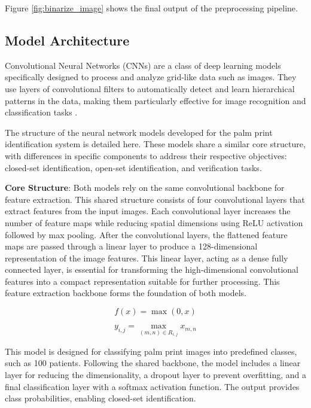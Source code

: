 \begin{enumerate}
    Figure \ref{fig:binarize_image} shows the final output of the preprocessing pipeline.
\end{enumerate}

\subsection{Model Architecture}
Convolutional Neural Networks (CNNs) are a class of deep learning models specifically designed to process and analyze grid-like data such as images. They use layers of convolutional filters to automatically detect and learn hierarchical patterns in the data, making them particularly effective for image recognition and classification tasks \cite{726791}.

The structure of the neural network models developed for the palm print identification system is detailed here. These models share a similar core structure, with differences in specific components to address their respective objectives: closed-set identification, open-set identification, and verification tasks.

\textbf{Core Structure}: Both models rely on the same convolutional backbone for feature extraction. This shared structure consists of four convolutional layers that extract features from the input images. Each convolutional layer increases the number of feature maps while reducing spatial dimensions using ReLU activation followed by max pooling. After the convolutional layers, the flattened feature maps are passed through a linear layer to produce a 128-dimensional representation of the image features. This linear layer, acting as a dense fully connected layer, is essential for transforming the high-dimensional convolutional features into a compact representation suitable for further processing. This feature extraction backbone forms the foundation of both models.

\begin{equation}
    f(x) = \max(0, x)
    \label{eq:relu}
\end{equation}

\begin{equation}
    y_{i,j} = \max_{(m,n) \in R_{i,j}} x_{m,n}
    \label{eq:maxpool}
\end{equation}

This model is designed for classifying palm print images into predefined classes, such as 100 patients. Following the shared backbone, the model includes a linear layer for reducing the dimensionality, a dropout layer to prevent overfitting, and a final classification layer with a softmax activation function. The output provides class probabilities, enabling closed-set identification.

